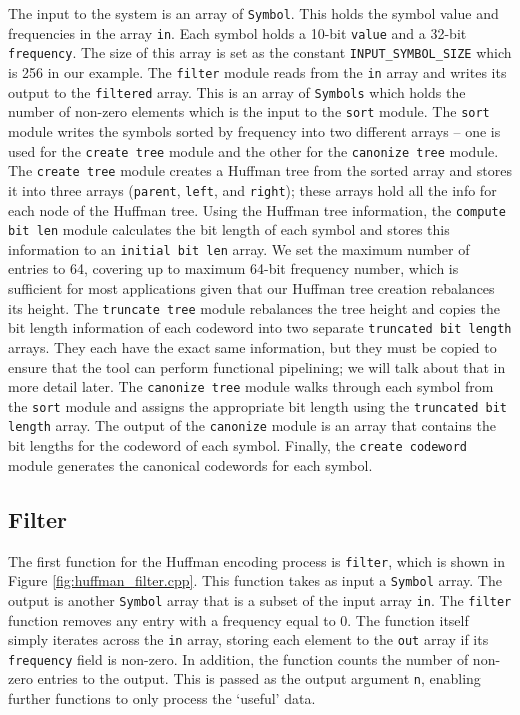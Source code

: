 The input to the system is an array of \lstinline{Symbol}. This holds the symbol value and frequencies in the array \lstinline{in}. Each symbol holds a 10-bit \lstinline{value} and a 32-bit \lstinline{frequency}. The size of this array is set as the constant \lstinline{INPUT_SYMBOL_SIZE} which is 256 in our example. The \lstinline{filter} module reads from the \lstinline{in} array and writes its output to the \lstinline{filtered} array. This is an array of \lstinline{Symbols} which holds the number of non-zero elements which is the input to the \lstinline{sort} module. The \lstinline{sort} module writes the symbols sorted by frequency into two different arrays -- one is used for the \lstinline{create tree} module and the other for the \lstinline{canonize tree} module. The \lstinline{create tree} module creates a Huffman tree from the sorted array and stores it into three arrays (\lstinline{parent}, \lstinline{left}, and \lstinline{right}); these arrays hold all the info for each node of the Huffman tree. Using the Huffman tree information, the \lstinline{compute bit len} module calculates the bit length of each symbol and stores this information to an \lstinline{initial bit len} array. We set the maximum number of entries to 64, covering up to maximum 64-bit frequency number, which is sufficient for most applications given that our Huffman tree creation rebalances its height. The \lstinline{truncate tree} module rebalances the tree height and copies the bit length information of each codeword into two separate \lstinline{truncated bit length} arrays. They each have the exact same information, but they must be copied to ensure that the \VHLS tool can perform functional pipelining; we will talk about that in more detail later. The \lstinline{canonize tree} module walks through each symbol from the \lstinline{sort} module and assigns the appropriate bit length using the \lstinline{truncated bit length} array. The output of the \lstinline{canonize} module is an array that contains the bit lengths for the codeword of each symbol. Finally, the \lstinline{create codeword} module generates the canonical codewords for each symbol.

\subsection{Filter}
 
The first function for the Huffman encoding process is \lstinline{filter}, which is shown in Figure \ref{fig:huffman_filter.cpp}. This function takes as input a \lstinline{Symbol} array. The output is another \lstinline{Symbol} array that is a subset of the input array \lstinline{in}. The \lstinline{filter} function removes any entry with a frequency equal to $0$.  The function itself simply iterates across the \lstinline{in} array, storing each element to the \lstinline{out} array if its \lstinline{frequency} field is non-zero. In addition, the function counts the number of non-zero entries to the output. This is passed as the output argument \lstinline{n}, enabling further functions to only process the `useful' data.

